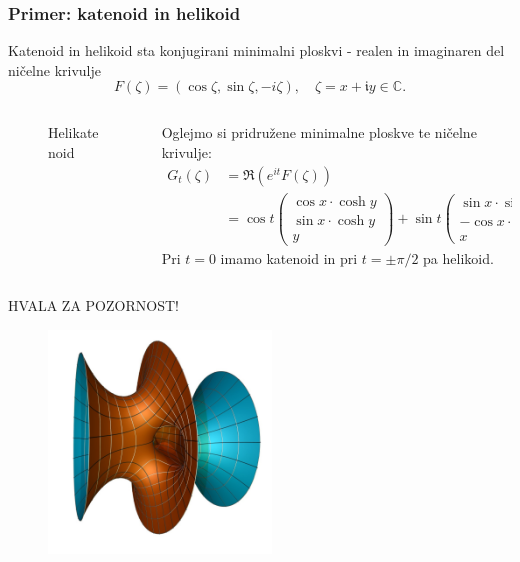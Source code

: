\documentclass[8pt]{beamer}
\theoremstyle{definition}
\theoremstyle{remark}
\theoremstyle{plain}
\numberwithin{equation}{section}  %
\begin{document}
\begin{frame}
    \frametitle{Primer: katenoid in helikoid}

    Katenoid in helikoid sta konjugirani minimalni ploskvi - realen in imaginaren del ničelne krivulje 
    \begin{equation*}
        F(\zeta)=(\cos \zeta, \sin \zeta,-i \zeta), \quad \zeta=x+\mathfrak{i} y \in \mathbb{C}.
    \end{equation*}

    \begin{columns}
        \begin{column}{0.37\textwidth}
            \begin{figure}
                \centering
                \caption{Helikatenoid}
            \end{figure}
        \end{column}

        \begin{column}{0.63\textwidth}
            Oglejmo si pridružene minimalne ploskve te ničelne krivulje:
            \begin{align*}
                G_t(\zeta) & =\Re\left(e^{i t} F(\zeta)\right) \\
                & =\cos t\begin{pmatrix}
                \cos x \cdot \cosh y \\
                \sin x \cdot \cosh y \\
                y
                \end{pmatrix}+\sin t\begin{pmatrix}
                \sin x \cdot \sinh y \\
                -\cos x \cdot \sinh y \\
                x
                \end{pmatrix}
            \end{align*}
            Pri $t=0$ imamo katenoid in pri $t= \pm \pi / 2$ pa helikoid. 
        \end{column}
    \end{columns}
    
\end{frame}

\begin{frame}
    \begin{center}
        \LARGE \textcolor{red1}{HVALA ZA POZORNOST!}

        \centering
        \begin{figure}
            \includegraphics[width=16em]{../Slike/Costa_Minimal_Surface.jpg}
        \end{figure}
    \end{center}

\end{frame}
\end{document}
